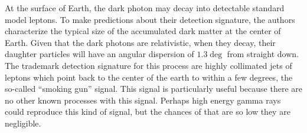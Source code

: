 \documentclass[12pt]{article}
\newcommand{\scap}[1]{\textsc{\MakeLowercase{#1}}} %
\begin{document}
	At the surface of Earth, the dark photon may decay into detectable standard model leptons. To make predictions about their detection signature, the authors characterize the typical size of the accumulated dark matter at the center of Earth. Given that the dark photons are relativistic, when they decay, their daughter particles will have an angular dispersion of $1.3\deg$ from straight down. The trademark detection signature for this process are highly collimated jets of leptons which point back to the center of the earth to within a few degrees, the so-called ``smoking gun'' signal. This signal is particularly useful because there are no other known processes with this signal. Perhaps high energy gamma rays could reproduce this kind of signal, but the chances of that are so low they are negligible. 
	
	
	
	
\end{document}
